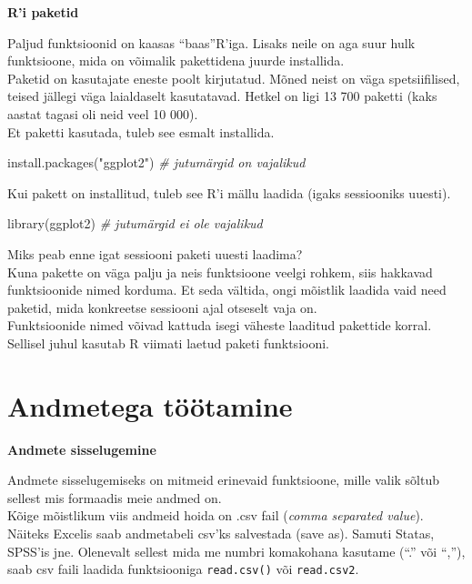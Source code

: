 \documentclass[
]{book}
\newenvironment{Shaded}{\begin{snugshade}}{\end{snugshade}}
\newcommand{\CommentTok}[1]{\textcolor[rgb]{0.56,0.35,0.01}{\textit{#1}}}
\newcommand{\FunctionTok}[1]{\textcolor[rgb]{0.00,0.00,0.00}{#1}}
\newcommand{\NormalTok}[1]{#1}
\newcommand{\StringTok}[1]{\textcolor[rgb]{0.31,0.60,0.02}{#1}}
\begin{document}
\textbf{R'i paketid}

Paljud funktsioonid on kaasas ``baas''R'iga. Lisaks neile on aga suur hulk funktsioone, mida on võimalik pakettidena juurde installida.\\
Paketid on kasutajate eneste poolt kirjutatud. Mõned neist on väga spetsiifilised, teised jällegi väga laialdaselt kasutatavad. Hetkel on ligi 13 700 paketti (kaks aastat tagasi oli neid veel 10 000).\\
Et paketti kasutada, tuleb see esmalt installida.

\begin{Shaded}
\begin{Highlighting}[]
\FunctionTok{install.packages}\NormalTok{(}\StringTok{"ggplot2"}\NormalTok{) }\CommentTok{\# jutumärgid on vajalikud}
\end{Highlighting}
\end{Shaded}

Kui pakett on installitud, tuleb see R'i mällu laadida (igaks sessiooniks uuesti).

\begin{Shaded}
\begin{Highlighting}[]
\FunctionTok{library}\NormalTok{(ggplot2) }\CommentTok{\# jutumärgid ei ole vajalikud}
\end{Highlighting}
\end{Shaded}

Miks peab enne igat sessiooni paketi uuesti laadima?\\
Kuna pakette on väga palju ja neis funktsioone veelgi rohkem, siis hakkavad funktsioonide nimed korduma. Et seda vältida, ongi mõistlik laadida vaid need paketid, mida konkreetse sessiooni ajal otseselt vaja on.\\
Funktsioonide nimed võivad kattuda isegi väheste laaditud pakettide korral. Sellisel juhul kasutab R viimati laetud paketi funktsiooni.

\hypertarget{andmetega-tuxf6uxf6tamine}{%
\section{Andmetega töötamine}\label{andmetega-tuxf6uxf6tamine}}

\textbf{Andmete sisselugemine}

Andmete sisselugemiseks on mitmeid erinevaid funktsioone, mille valik sõltub sellest mis formaadis meie andmed on.\\
Kõige mõistlikum viis andmeid hoida on .csv fail (\emph{comma separated value}). Näiteks Excelis saab andmetabeli csv'ks salvestada (save as). Samuti Statas, SPSS'is jne. Olenevalt sellest mida me numbri komakohana kasutame (``.'' või ``,''), saab csv faili laadida funktsiooniga \texttt{read.csv()} või \texttt{read.csv2}.
\end{document}
